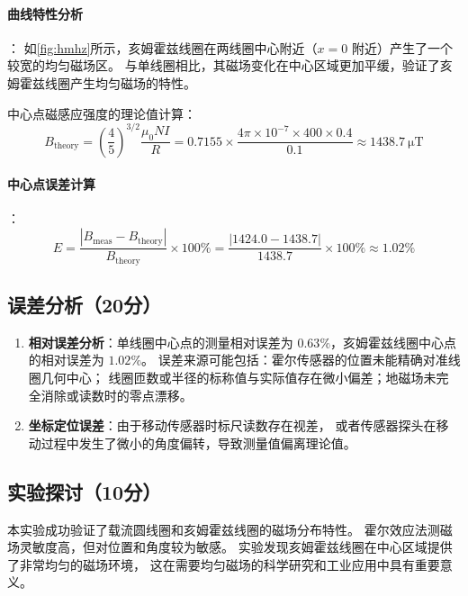 \documentclass{../template/Report}%
\begin{document}
\begin{fullreportonly}
    \paragraph{曲线特性分析}：
    如\cref{fig:hmhz}所示，亥姆霍兹线圈在两线圈中心附近（$x=0$ 附近）产生了一个较宽的均匀磁场区。
    与单线圈相比，其磁场变化在中心区域更加平缓，验证了亥姆霍兹线圈产生均匀磁场的特性。

    中心点磁感应强度的理论值计算：
    \begin{equation*}
        B_{\text{theory}} = \left(\frac{4}{5}\right)^{3/2} \frac{\mu_0 N I}{R} = 0.7155 \times \frac{4\pi \times 10^{-7} \times 400 \times 0.4}{0.1} \approx \SI{1438.7}{\micro\tesla}
    \end{equation*}

    \paragraph{中心点误差计算}：
    \begin{equation*}
        E = \frac{|B_{\text{meas}} - B_{\text{theory}}|}{B_{\text{theory}}} \times 100\% = \frac{|1424.0 - 1438.7|}{1438.7} \times 100\% \approx 1.02\%
    \end{equation*}

    \subsection{误差分析（20分）}
    \begin{enumerate}
        \item \textbf{相对误差分析}：单线圈中心点的测量相对误差为 $0.63\%$，亥姆霍兹线圈中心点的相对误差为 $1.02\%$。
              误差来源可能包括：霍尔传感器的位置未能精确对准线圈几何中心；
              线圈匝数或半径的标称值与实际值存在微小偏差；地磁场未完全消除或读数时的零点漂移。
        \item \textbf{坐标定位误差}：由于移动传感器时标尺读数存在视差，
              或者传感器探头在移动过程中发生了微小的角度偏转，导致测量值偏离理论值。
    \end{enumerate}
    \subsection{实验探讨（10分）}
    本实验成功验证了载流圆线圈和亥姆霍兹线圈的磁场分布特性。
    霍尔效应法测磁场灵敏度高，但对位置和角度较为敏感。
    实验发现亥姆霍兹线圈在中心区域提供了非常均匀的磁场环境，
    这在需要均匀磁场的科学研究和工业应用中具有重要意义。


\end{fullreportonly}
\end{document}
